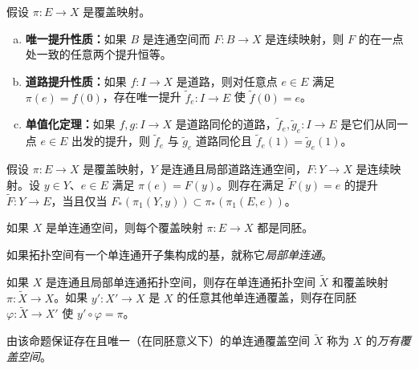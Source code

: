 \documentclass[../../main.tex]{subfiles}
\begin{document}
\begin{proposition}[覆盖映射的提升性质]\label{proposition:appA-lifting-properties}
假设 $\pi:E\to X$ 是覆盖映射。
\begin{enumerate}[(a)]
\item \textbf{唯一提升性质：}如果 $B$ 是连通空间而 $F:B\to X$ 是连续映射，则 $F$ 的在一点处一致的任意两个提升恒等。
\item \textbf{道路提升性质：}如果 $f:I\to X$ 是道路，则对任意点 $e\in E$ 满足 $\pi(e)=f(0)$，存在唯一提升 $\widetilde f_e:I\to E$ 使 $\widetilde f(0)=e$。
\item \textbf{单值化定理：}如果 $f,g:I\to X$ 是道路同伦的道路，$\widetilde f_e,\widetilde g_e:I\to E$ 是它们从同一点 $e\in E$ 出发的提升，则 $\widetilde f_e$ 与 $\widetilde g_e$ 道路同伦且 $\widetilde f_e(1)=\widetilde g_e(1)$。
\end{enumerate}
\end{proposition}

\begin{proposition}[提升判别准则]\label{proposition:appA-lifting-criterion}
假设 $\pi:E\to X$ 是覆盖映射，$Y$ 是连通且局部道路连通空间，$F:Y\to X$ 是连续映射。设 $y\in Y$、$e\in E$ 满足 $\pi(e)=F(y)$。则存在满足 $\widetilde F(y)=e$ 的提升 $\widetilde F:Y\to E$，当且仅当 $F_*(\pi_1(Y,y))\subset\pi_*(\pi_1(E,e))$。
\end{proposition}

\begin{proposition}[单连通空间的覆盖]\label{proposition:appA-simply-connected-coverings}
如果 $X$ 是单连通空间，则每个覆盖映射 $\pi:E\to X$ 都是同胚。
\end{proposition}

如果拓扑空间有一个单连通开子集构成的基，就称它\emph{局部单连通}。

\begin{proposition}[万有覆盖空间的存在性]\label{proposition:appA-universal-covering}
如果 $X$ 是连通且局部单连通拓扑空间，则存在单连通拓扑空间 $\widetilde X$ 和覆盖映射 $\pi:\widetilde X\to X$。如果 $y':X'\to X$ 是 $X$ 的任意其他单连通覆盖，则存在同胚 $\varphi:\widetilde X\to X'$ 使 $y'\circ\varphi=\pi$。
\end{proposition}

由该命题保证存在且唯一（在同胚意义下）的单连通覆盖空间 $\widetilde X$ 称为 $X$ 的\emph{万有覆盖空间}。
\end{document}
